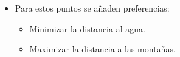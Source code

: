 \begin{frame}
\begin{itemize}
\begin{itemize}
			\vspace{0.5em}
			
			\item<4-> Para estos puntos se añaden preferencias:
			
			\vspace{0.5em}
			\begin{itemize}
				\item<4-> \textcolor{UDCpink}{Minimizar la distancia al agua}.
				
				\vspace{0.5em}
				
				\item<5-> \textcolor{UDCpink}{Maximizar la distancia a las montañas}.
			\end{itemize}
		\end{itemize}
	\end{itemize}

\end{frame}